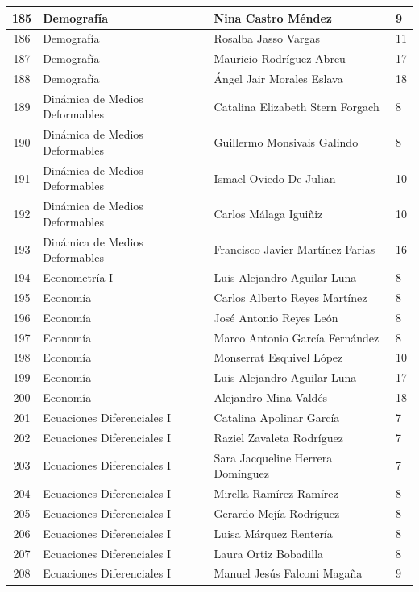 {\begin{longtable}{|c|p{6.5cm}|p{5cm}|p{1.5cm}|}
  185 & Demografía & Nina Castro Méndez & 9 \\ \hline 
  186 & Demografía & Rosalba Jasso Vargas & 11 \\ \hline 
  187 & Demografía & Mauricio Rodríguez Abreu & 17 \\ \hline 
  188 & Demografía & Ángel Jair Morales Eslava & 18 \\ \hline 
  189 & Dinámica de Medios Deformables & Catalina Elizabeth Stern Forgach & 8 \\ \hline 
  190 & Dinámica de Medios Deformables & Guillermo Monsivais Galindo & 8 \\ \hline 
  191 & Dinámica de Medios Deformables & Ismael Oviedo De Julian & 10 \\ \hline 
  192 & Dinámica de Medios Deformables & Carlos Málaga Iguiñiz & 10 \\ \hline 
  193 & Dinámica de Medios Deformables & Francisco Javier Martínez Farias & 16 \\ \hline 
  194 & Econometría I & Luis Alejandro Aguilar Luna & 8 \\ \hline 
  195 & Economía & Carlos Alberto Reyes Martínez & 8 \\ \hline 
  196 & Economía & José Antonio Reyes León & 8 \\ \hline 
  197 & Economía & Marco Antonio García Fernández & 8 \\ \hline 
  198 & Economía & Monserrat Esquivel López & 10 \\ \hline 
  199 & Economía & Luis Alejandro Aguilar Luna & 17 \\ \hline 
  200 & Economía & Alejandro Mina Valdés & 18 \\ \hline 
  201 & Ecuaciones Diferenciales I & Catalina Apolinar García & 7 \\ \hline 
  202 & Ecuaciones Diferenciales I & Raziel Zavaleta Rodríguez & 7 \\ \hline 
  203 & Ecuaciones Diferenciales I & Sara Jacqueline Herrera Domínguez & 7 \\ \hline 
  204 & Ecuaciones Diferenciales I & Mirella Ramírez Ramírez & 8 \\ \hline 
  205 & Ecuaciones Diferenciales I & Gerardo Mejía Rodríguez & 8 \\ \hline 
  206 & Ecuaciones Diferenciales I & Luisa Márquez Rentería & 8 \\ \hline 
  207 & Ecuaciones Diferenciales I & Laura Ortiz Bobadilla & 8 \\ \hline 
  208 & Ecuaciones Diferenciales I & Manuel Jesús Falconi Magaña & 9 \\ \hline 

\end{longtable}}
